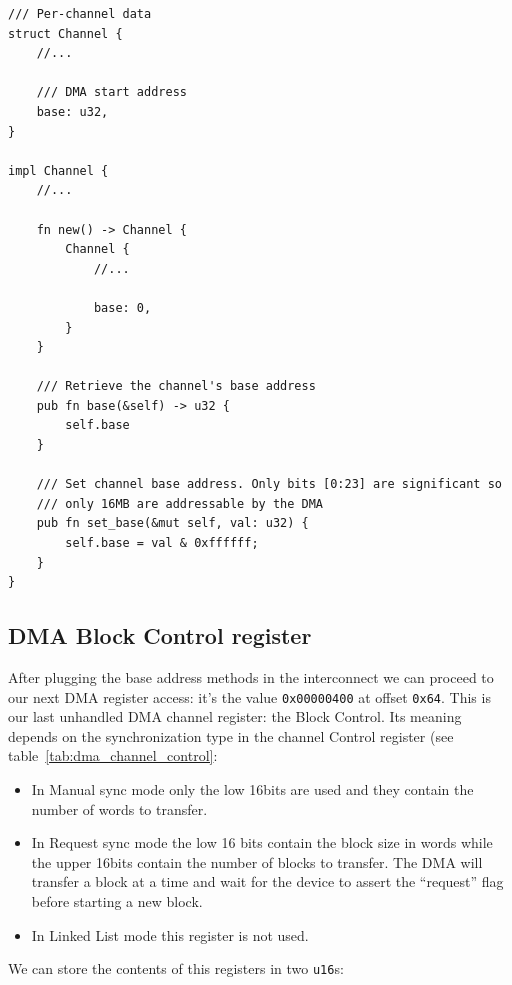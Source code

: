 \documentclass[a4paper]{article}
\newcommand{\code}[1] {\texttt{#1}}
\begin{document}
\begin{lstlisting}
/// Per-channel data
struct Channel {
    //...

    /// DMA start address
    base: u32,
}

impl Channel {
    //...

    fn new() -> Channel {
        Channel {
            //...

            base: 0,
        }
    }

    /// Retrieve the channel's base address
    pub fn base(&self) -> u32 {
        self.base
    }

    /// Set channel base address. Only bits [0:23] are significant so
    /// only 16MB are addressable by the DMA
    pub fn set_base(&mut self, val: u32) {
        self.base = val & 0xffffff;
    }
}
\end{lstlisting}

\subsection{DMA Block Control register}

After plugging the base address methods in the interconnect we can
proceed to our next DMA register access: it's the value
\code{0x00000400} at offset \code{0x64}. This is our last unhandled
DMA channel register: the Block Control. Its meaning depends on the
synchronization type in the channel Control register (see
table~\ref{tab:dma_channel_control}:

\begin{itemize}
\item In Manual sync mode only the low 16bits are used and they contain
  the number of words to transfer.
\item In Request sync mode the low 16 bits contain the block size in words
  while the upper 16bits contain the number of blocks to transfer. The
  DMA will transfer a block at a time and wait for the device to
  assert the ``request'' flag before starting a new block.
\item In Linked List mode this register is not used.
\end{itemize}

We can store the contents of this registers in two \code{u16}s:
\end{document}

